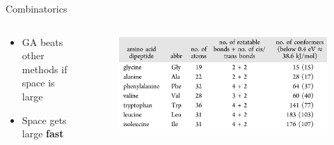 \documentclass[10pt]{beamer}
\begin{document}
{%
\begin{frame}{Combinatorics}
	\begin{columns}[c] %
		\begin{column}{.4\textwidth}
			\begin{itemize}
				\item {GA beats other methods if space is large}
				\item {Space gets large \textbf{\alert{fast}}}
			\end{itemize}		
		\end{column}
		\hfill
		\begin{column}{0.6\textwidth}
			\begin{figure}
				\includegraphics[width=\linewidth]{images/Confnums.png}
			\end{figure}
		\end{column}	
	\end{columns}
\end{frame}
}
\end{document}
